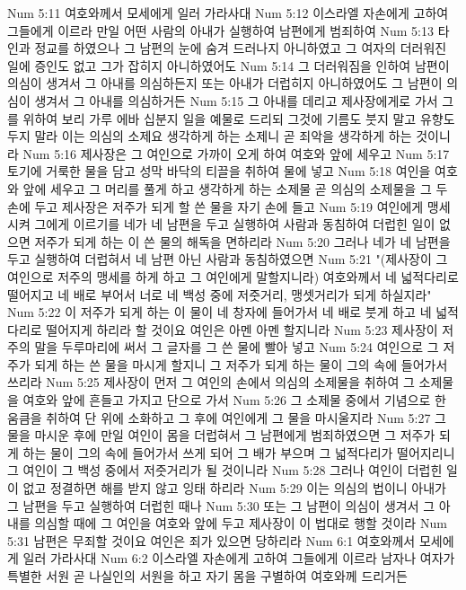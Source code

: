 Num 5:11  여호와께서 모세에게 일러 가라사대
Num 5:12  이스라엘 자손에게 고하여 그들에게 이르라 만일 어떤 사람의 아내가 실행하여 남편에게 범죄하여
Num 5:13  타인과 정교를 하였으나 그 남편의 눈에 숨겨 드러나지 아니하였고 그 여자의 더러워진 일에 증인도 없고 그가 잡히지 아니하였어도
Num 5:14  그 더러워짐을 인하여 남편이 의심이 생겨서 그 아내를 의심하든지 또는 아내가 더럽히지 아니하였어도 그 남편이 의심이 생겨서 그 아내를 의심하거든
Num 5:15  그 아내를 데리고 제사장에게로 가서 그를 위하여 보리 가루 에바 십분지 일을 예물로 드리되 그것에 기름도 붓지 말고 유향도 두지 말라 이는 의심의 소제요 생각하게 하는 소제니 곧 죄악을 생각하게 하는 것이니라
Num 5:16  제사장은 그 여인으로 가까이 오게 하여 여호와 앞에 세우고
Num 5:17  토기에 거룩한 물을 담고 성막 바닥의 티끌을 취하여 물에 넣고
Num 5:18  여인을 여호와 앞에 세우고 그 머리를 풀게 하고 생각하게 하는 소제물 곧 의심의 소제물을 그 두 손에 두고 제사장은 저주가 되게 할 쓴 물을 자기 손에 들고
Num 5:19  여인에게 맹세시켜 그에게 이르기를 네가 네 남편을 두고 실행하여 사람과 동침하여 더럽힌 일이 없으면 저주가 되게 하는 이 쓴 물의 해독을 면하리라
Num 5:20  그러나 네가 네 남편을 두고 실행하여 더럽혀서 네 남편 아닌 사람과 동침하였으면
Num 5:21  "(제사장이 그 여인으로 저주의 맹세를 하게 하고 그 여인에게 말할지니라) 여호와께서 네 넓적다리로 떨어지고 네 배로 부어서 너로 네 백성 중에 저줏거리, 맹셋거리가 되게 하실지라"
Num 5:22  이 저주가 되게 하는 이 물이 네 창자에 들어가서 네 배로 붓게 하고 네 넓적다리로 떨어지게 하리라 할 것이요 여인은 아멘 아멘 할지니라
Num 5:23  제사장이 저주의 말을 두루마리에 써서 그 글자를 그 쓴 물에 빨아 넣고
Num 5:24  여인으로 그 저주가 되게 하는 쓴 물을 마시게 할지니 그 저주가 되게 하는 물이 그의 속에 들어가서 쓰리라
Num 5:25  제사장이 먼저 그 여인의 손에서 의심의 소제물을 취하여 그 소제물을 여호와 앞에 흔들고 가지고 단으로 가서
Num 5:26  그 소제물 중에서 기념으로 한 움큼을 취하여 단 위에 소화하고 그 후에 여인에게 그 물을 마시울지라
Num 5:27  그 물을 마시운 후에 만일 여인이 몸을 더럽혀서 그 남편에게 범죄하였으면 그 저주가 되게 하는 물이 그의 속에 들어가서 쓰게 되어 그 배가 부으며 그 넓적다리가 떨어지리니 그 여인이 그 백성 중에서 저줏거리가 될 것이니라
Num 5:28  그러나 여인이 더럽힌 일이 없고 정결하면 해를 받지 않고 잉태 하리라
Num 5:29  이는 의심의 법이니 아내가 그 남편을 두고 실행하여 더럽힌 때나
Num 5:30  또는 그 남편이 의심이 생겨서 그 아내를 의심할 때에 그 여인을 여호와 앞에 두고 제사장이 이 법대로 행할 것이라
Num 5:31  남편은 무죄할 것이요 여인은 죄가 있으면 당하리라
Num 6:1  여호와께서 모세에게 일러 가라사대
Num 6:2  이스라엘 자손에게 고하여 그들에게 이르라 남자나 여자가 특별한 서원 곧 나실인의 서원을 하고 자기 몸을 구별하여 여호와께 드리거든
